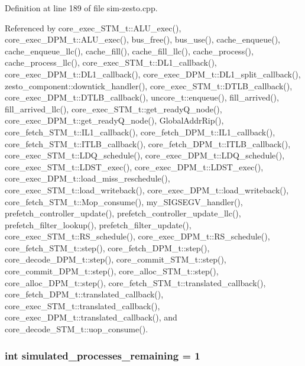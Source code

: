 Definition at line 189 of file sim-zesto.cpp.

Referenced by core\_\-exec\_\-STM\_\-t::ALU\_\-exec(), core\_\-exec\_\-DPM\_\-t::ALU\_\-exec(), bus\_\-free(), bus\_\-use(), cache\_\-enqueue(), cache\_\-enqueue\_\-llc(), cache\_\-fill(), cache\_\-fill\_\-llc(), cache\_\-process(), cache\_\-process\_\-llc(), core\_\-exec\_\-STM\_\-t::DL1\_\-callback(), core\_\-exec\_\-DPM\_\-t::DL1\_\-callback(), core\_\-exec\_\-DPM\_\-t::DL1\_\-split\_\-callback(), zesto\_\-component::downtick\_\-handler(), core\_\-exec\_\-STM\_\-t::DTLB\_\-callback(), core\_\-exec\_\-DPM\_\-t::DTLB\_\-callback(), uncore\_\-t::enqueue(), fill\_\-arrived(), fill\_\-arrived\_\-llc(), core\_\-exec\_\-STM\_\-t::get\_\-readyQ\_\-node(), core\_\-exec\_\-DPM\_\-t::get\_\-readyQ\_\-node(), GlobalAddrRip(), core\_\-fetch\_\-STM\_\-t::IL1\_\-callback(), core\_\-fetch\_\-DPM\_\-t::IL1\_\-callback(), core\_\-fetch\_\-STM\_\-t::ITLB\_\-callback(), core\_\-fetch\_\-DPM\_\-t::ITLB\_\-callback(), core\_\-exec\_\-STM\_\-t::LDQ\_\-schedule(), core\_\-exec\_\-DPM\_\-t::LDQ\_\-schedule(), core\_\-exec\_\-STM\_\-t::LDST\_\-exec(), core\_\-exec\_\-DPM\_\-t::LDST\_\-exec(), core\_\-exec\_\-DPM\_\-t::load\_\-miss\_\-reschedule(), core\_\-exec\_\-STM\_\-t::load\_\-writeback(), core\_\-exec\_\-DPM\_\-t::load\_\-writeback(), core\_\-fetch\_\-STM\_\-t::Mop\_\-consume(), my\_\-SIGSEGV\_\-handler(), prefetch\_\-controller\_\-update(), prefetch\_\-controller\_\-update\_\-llc(), prefetch\_\-filter\_\-lookup(), prefetch\_\-filter\_\-update(), core\_\-exec\_\-STM\_\-t::RS\_\-schedule(), core\_\-exec\_\-DPM\_\-t::RS\_\-schedule(), core\_\-fetch\_\-STM\_\-t::step(), core\_\-fetch\_\-DPM\_\-t::step(), core\_\-decode\_\-DPM\_\-t::step(), core\_\-commit\_\-STM\_\-t::step(), core\_\-commit\_\-DPM\_\-t::step(), core\_\-alloc\_\-STM\_\-t::step(), core\_\-alloc\_\-DPM\_\-t::step(), core\_\-fetch\_\-STM\_\-t::translated\_\-callback(), core\_\-fetch\_\-DPM\_\-t::translated\_\-callback(), core\_\-exec\_\-STM\_\-t::translated\_\-callback(), core\_\-exec\_\-DPM\_\-t::translated\_\-callback(), and core\_\-decode\_\-STM\_\-t::uop\_\-consume().
\subsubsection[{simulated\_\-processes\_\-remaining}]{\setlength{\rightskip}{0pt plus 5cm}int {\bf simulated\_\-processes\_\-remaining} = 1}\label{sim-zesto_8cpp_1b2701dab57f1ffb6459bbde33452d68}




